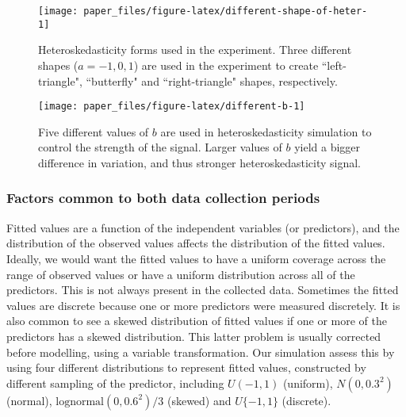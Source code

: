 \documentclass[]{interact}
\theoremstyle{plain}%
\theoremstyle{definition}
\theoremstyle{remark}
\begin{document}
\begin{figure}[!h]

{\centering \texttt{[image: paper\_files/figure-latex/different-shape-of-heter-1]} 

}

\caption{Heteroskedasticity forms used in the experiment. Three different shapes ($a = -1, 0, 1$) are used in the experiment to create ``left-triangle", ``butterfly" and ``right-triangle" shapes, respectively.}\label{fig:different-shape-of-heter}
\end{figure}

\begin{figure}[!h]

{\centering \texttt{[image: paper\_files/figure-latex/different-b-1]} 

}

\caption{Five different values of $b$ are used in heteroskedasticity simulation to control the strength of the signal. Larger values of $b$ yield a bigger difference in variation, and thus stronger heteroskedasticity signal.}\label{fig:different-b}
\end{figure}

\hypertarget{factors-common-to-both-data-collection-periods}{%
\subsubsection{Factors common to both data collection
periods}\label{factors-common-to-both-data-collection-periods}}

Fitted values are a function of the independent variables (or
predictors), and the distribution of the observed values affects the
distribution of the fitted values. Ideally, we would want the fitted
values to have a uniform coverage across the range of observed values or
have a uniform distribution across all of the predictors. This is not
always present in the collected data. Sometimes the fitted values are
discrete because one or more predictors were measured discretely. It is
also common to see a skewed distribution of fitted values if one or more
of the predictors has a skewed distribution. This latter problem is
usually corrected before modelling, using a variable transformation. Our
simulation assess this by using four different distributions to
represent fitted values, constructed by different sampling of the
predictor, including \(U(-1, 1)\) (uniform), \(N(0, 0.3^2)\) (normal),
\(\text{lognormal}(0, 0.6^2)/3\) (skewed) and \(U\{-1, 1\}\) (discrete).
\end{document}
